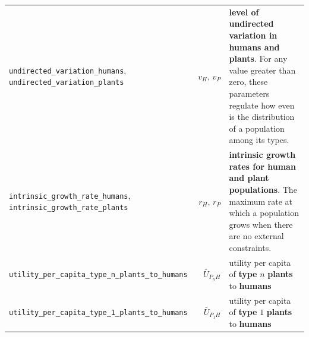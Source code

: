 \documentclass[
]{book}
\begin{document}
\begin{longtable}[]{@{}lrl@{}}
\begin{minipage}[t]{0.27\columnwidth}\raggedright
\texttt{undirected\_variation\_humans}, \texttt{undirected\_variation\_plants}\strut
\end{minipage} & \begin{minipage}[t]{0.25\columnwidth}\raggedleft
\(v_{H},\,v_{P}\)\strut
\end{minipage} & \begin{minipage}[t]{0.39\columnwidth}\raggedright
\textbf{level of undirected variation in humans and plants}. For any value greater than zero, these parameters regulate how even is the distribution of a population among its types.\strut
\end{minipage}\tabularnewline
\begin{minipage}[t]{0.27\columnwidth}\raggedright
\texttt{intrinsic\_growth\_rate\_humans}, \texttt{intrinsic\_growth\_rate\_plants}\strut
\end{minipage} & \begin{minipage}[t]{0.25\columnwidth}\raggedleft
\(r_{H},\,r_{P}\)\strut
\end{minipage} & \begin{minipage}[t]{0.39\columnwidth}\raggedright
\textbf{intrinsic growth rates for human and plant populations}. The maximum rate at which a population grows when there are no external constraints.\strut
\end{minipage}\tabularnewline
\begin{minipage}[t]{0.27\columnwidth}\raggedright
\texttt{utility\_per\_capita\_type\_n\_plants\_to\_humans}\strut
\end{minipage} & \begin{minipage}[t]{0.25\columnwidth}\raggedleft
\(\bar{U}_{P_{n}H}\)\strut
\end{minipage} & \begin{minipage}[t]{0.39\columnwidth}\raggedright
utility per capita of \textbf{type} \(n\) \textbf{plants} to \textbf{humans}\strut
\end{minipage}\tabularnewline
\begin{minipage}[t]{0.27\columnwidth}\raggedright
\texttt{utility\_per\_capita\_type\_1\_plants\_to\_humans}\strut
\end{minipage} & \begin{minipage}[t]{0.25\columnwidth}\raggedleft
\(\bar{U}_{P_{1}H}\)\strut
\end{minipage} & \begin{minipage}[t]{0.39\columnwidth}\raggedright
utility per capita of \textbf{type} \(1\) \textbf{plants} to \textbf{humans}\strut

\end{minipage}
\end{longtable}
\end{document}
